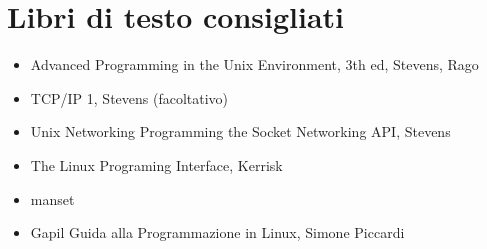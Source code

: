 
\section{Libri di testo consigliati}
\begin{itemize}
	\item Advanced Programming in the Unix Environment, 3th ed, Stevens, Rago
	\item TCP/IP 1, Stevens (facoltativo)
	\item Unix Networking Programming the Socket Networking API, Stevens
	\item The Linux Programing Interface, Kerrisk
	\item manset
	\item Gapil Guida alla Programmazione in Linux, Simone Piccardi
\end{itemize}